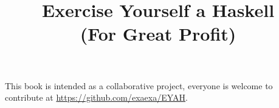 \documentclass[10pt,a5paper]{book}
\title{Exercise Yourself a Haskell \\ \vspace{1em} \Large (For Great Profit)}
\date{}
\begin{document}
\maketitle
This book is intended as a collaborative project, everyone is welcome to
contribute at \url{https://github.com/exaexa/EYAH}.
\end{document}
